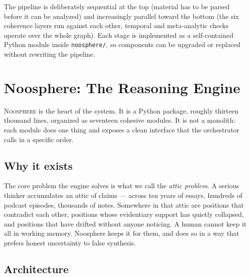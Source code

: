 \documentclass[11pt]{article}
\begin{document}
The pipeline is deliberately sequential at the top (material has to be parsed before it can be analyzed) and increasingly parallel toward the bottom (the six coherence layers run against each other, temporal and meta-analytic checks operate over the whole graph). Each stage is implemented as a self-contained Python module inside \texttt{noosphere/}, so components can be upgraded or replaced without rewriting the pipeline.

\clearpage

\section{Noosphere: The Reasoning Engine}

\textsc{Noosphere} is the heart of the system. It is a Python package, roughly thirteen thousand lines, organized as seventeen cohesive modules. It is not a monolith: each module does one thing and exposes a clean interface that the orchestrator calls in a specific order.

\subsection{Why it exists}

The core problem the engine solves is what we call the \emph{attic problem}. A serious thinker accumulates an attic of claims --- across ten years of essays, hundreds of podcast episodes, thousands of notes. Somewhere in that attic are positions that contradict each other, positions whose evidentiary support has quietly collapsed, and positions that have drifted without anyone noticing. A human cannot keep it all in working memory. Noosphere keeps it for them, and does so in a way that prefers honest uncertainty to false synthesis.

\subsection{Architecture}
\end{document}
